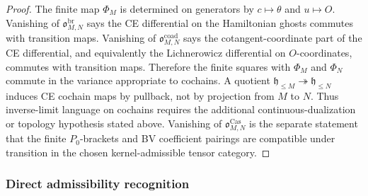 \begin{proof}
  The finite map \(\Phi_M\) is determined on generators by
  \(c\mapsto\theta\) and \(u\mapsto O\).  Vanishing of
  \(\mathfrak o^{\mathrm{br}}_{M,N}\) says the CE differential on the
  Hamiltonian ghosts commutes with transition maps.  Vanishing of
  \(\mathfrak o^{\mathrm{coad}}_{M,N}\) says the cotangent-coordinate
  part of the CE differential, and equivalently the Lichnerowicz
  differential on \(O\)-coordinates, commutes with transition maps.
  Therefore the finite squares with \(\Phi_M\) and \(\Phi_N\) commute in
  the variance appropriate to cochains.  A quotient
  \(\mathfrak h_{\leq M}\twoheadrightarrow\mathfrak h_{\leq N}\) induces
  CE cochain maps by pullback, not by projection from \(M\) to \(N\).
  Thus inverse-limit language on cochains requires the additional
  continuous-dualization or topology hypothesis stated above.  Vanishing
  of \(\mathfrak o^{\mathrm{Cas}}_{M,N}\) is the separate statement that
  the finite \(P_0\)-brackets and BV coefficient pairings are compatible
  under transition in the chosen kernel-admissible tensor category.
\end{proof}

\subsubsection{Direct admissibility recognition}

